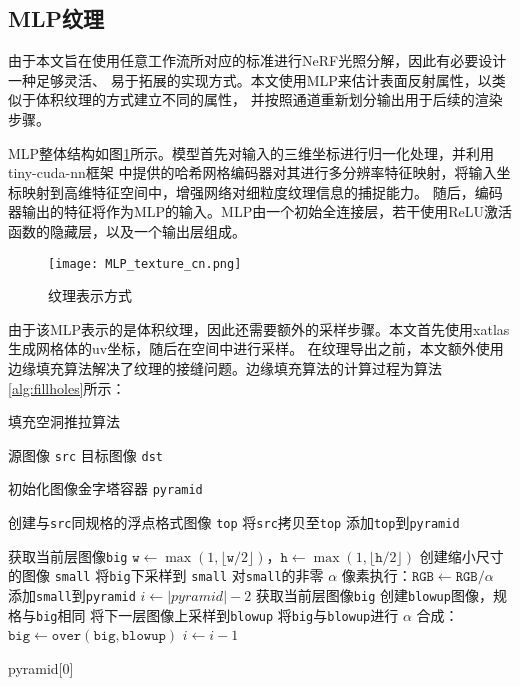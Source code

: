 \subsection{MLP纹理} \label{sec:mlp_texture}
由于本文旨在使用任意工作流所对应的标准进行NeRF光照分解，因此有必要设计一种足够灵活、
易于拓展的实现方式。本文使用MLP来估计表面反射属性，以类似于体积纹理的方式建立不同的属性，
并按照通道重新划分输出用于后续的渲染步骤。

MLP整体结构如图\ref{fig:mlp_texture_cn}所示。模型首先对输入的三维坐标进行归一化处理，并利用tiny-cuda-nn框架\cite{Muller_tiny-cuda-nn_2021}
中提供的哈希网格编码器对其进行多分辨率特征映射，将输入坐标映射到高维特征空间中，增强网络对细粒度纹理信息的捕捉能力。
随后，编码器输出的特征将作为MLP的输入。MLP由一个初始全连接层，若干使用ReLU激活函数的隐藏层，以及一个输出层组成。
\begin{figure}[htb]
  \centering
  \texttt{[image: MLP\_texture\_cn.png]}
  \caption{纹理表示方式}
  \label{fig:mlp_texture_cn}
\end{figure}

由于该MLP表示的是体积纹理，因此还需要额外的采样步骤。本文首先使用xatlas生成网格体的uv坐标，随后在空间中进行采样。
在纹理导出之前，本文额外使用边缘填充算法解决了纹理的接缝问题。边缘填充算法的计算过程为算法\ref{alg:fillholes}所示：

\renewcommand{\algorithmicrequire}{\textbf{输入：}\unskip}
\renewcommand{\algorithmicensure}{\textbf{输出：}\unskip}

\begin{algorithm}
  \caption{填充空洞推拉算法}
  \label{alg:fillholes}
  \small
  \begin{algorithmic}[1]
  \REQUIRE 源图像 \texttt{src}
  \ENSURE 目标图像 \texttt{dst}
  
  \STATE 初始化图像金字塔容器 \texttt{pyramid}
  
  \STATE 创建与\texttt{src}同规格的浮点格式图像 \texttt{top}
  \STATE 将\texttt{src}拷贝至\texttt{top}
  \STATE 添加\texttt{top}到\texttt{pyramid}
  
      \STATE 获取当前层图像\texttt{big}
      \STATE $\texttt{w} \gets \max(1, \lfloor \texttt{w}/2 \rfloor)$，$\texttt{h} \gets \max(1, \lfloor \texttt{h}/2 \rfloor)$
      \STATE 创建缩小尺寸的图像 \texttt{small}
      \STATE 将\texttt{big}下采样到 \texttt{small}
      \STATE 对\texttt{small}的非零 $\alpha$ 像素执行：$\texttt{RGB} \gets \texttt{RGB} / \alpha$
      \STATE 添加\texttt{small}到\texttt{pyramid}
  \ENDWHILE
  \STATE $i \gets |pyramid| - 2$
      \STATE 获取当前层图像\texttt{big}
      \STATE 创建\texttt{blowup}图像，规格与\texttt{big}相同
      \STATE 将下一层图像上采样到\texttt{blowup}
      \STATE 将\texttt{big}与\texttt{blowup}进行 $\alpha$ 合成：$\texttt{big} \gets \texttt{over}(\texttt{big}, \texttt{blowup})$
      \STATE $i \gets i - 1$
  \ENDWHILE

  \RETURN pyramid[0]
  \end{algorithmic}
  \end{algorithm}

